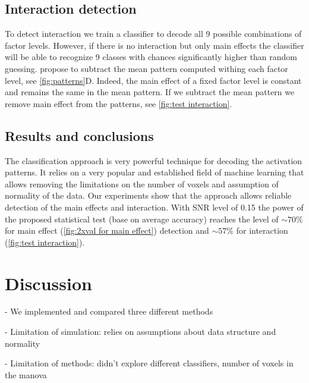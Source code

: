 \documentclass[paper=a4,fontsize=12pt]{scrartcl}
\numberwithin{equation}{section} %
\numberwithin{figure}{section} %
\numberwithin{table}{section} %
\begin{document}
\subsection{Interaction detection}

To detect interaction  we train a classifier to decode all 9 possible combinations of factor levels. However, if there is no interaction but only main effects the classifier will be able to recognize 9 classes with chances significantly higher than random guessing. \cite{Kornysheva2014} propose to subtract the mean pattern computed withing each factor level, see \autoref{fig:patterns}D. Indeed, the main effect of a fixed factor level is constant and remains the same in the mean pattern. If we subtract the mean pattern we remove main effect from the patterns, see \autoref{fig:test interaction}.

\subsection{Results and conclusions}

The classification approach is very powerful technique for decoding the activation patterns. It relies on a very popular and established field of machine learning that allows removing the limitations on the number of voxels and assumption of normality of the data. Our experiments show that the approach allows reliable detection of the main effects and interaction. With SNR level of 0.15 the power of the proposed statistical test (base on average accuracy) reaches the level of $\sim70\%$ for main effect (\autoref{fig:2xval for main effect}) detection and $\sim57\%$ for interaction (\autoref{fig:test interaction}).

\section{Discussion}

 - We implemented and compared three different methods

 - Limitation of simulation: relies on assumptions about data structure and normality

 - Limitation of methods: didn't explore different classifiers, number of voxels in the manova



\end{document}
